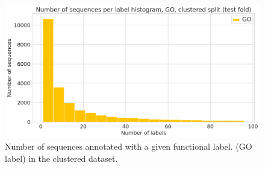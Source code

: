 \begin{figure}[htbp]
\centering
  \DIFdelbeginFL %
\DIFdelendFL \DIFaddbeginFL \includegraphics[width=\textwidth]{sequences_per_label_go_clustered.png}
  \DIFaddendFL \caption{Number of sequences annotated with a given functional label. (GO label) in the clustered dataset.}
\end{figure}
\DIFdelbegin %
\DIFdelend \DIFaddbegin 

